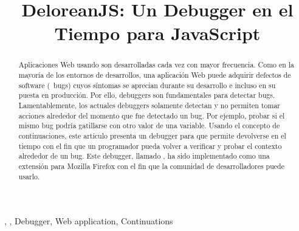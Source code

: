 \documentclass[conference]{IEEEtran}
\begin{document}
\title{DeloreanJS: Un Debugger en el Tiempo para JavaScript\\
}

\author{
\and
{}
\and
{}
}

\maketitle

\begin{abstract}
Aplicaciones Web usando \javascript son desarrolladas cada vez con mayor frecuencia. Como en la mayor\'ia de los entornos de desarrollos, una aplicaci\'on Web puede adquirir defectos de software (\aka~bugs) cuyos s\'intomas se aprecian durante su desarrollo e incluso en su puesta en producci\'on. Por ello, debuggers son fundamentales para detectar bugs. Lamentablemente, los actuales debuggers solamente detectan y no permiten tomar acciones alrededor del momento que fue detectado un bug. Por ejemplo, probar si el mismo bug podr\'ia gatillarse con otro valor de una variable. Usando el concepto de continuaciones, este art\'iculo presenta un debugger para \javascript que permite devolverse en el tiempo con el fin que un programador pueda volver a verificar y probar el contexto alrededor de un bug. Este debugger, llamado \deloreanjs, ha sido implementado como una extensi\'on para Mozilla Firefox con el fin que la comunidad de desarrolladores puede usarlo.         
\end{abstract}

\begin{IEEEkeywords}
\deloreanjs, \javascript, Debugger, Web application, Continuations
\end{IEEEkeywords}
\end{document}
